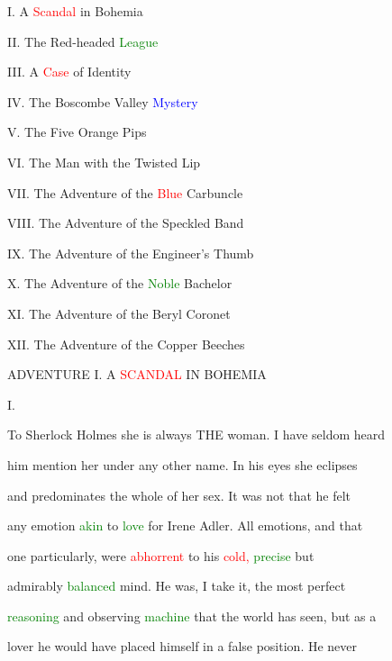  I. A \textcolor{red}{Scandal} in Bohemia

 II. The Red-headed \textcolor{green}{League}

 III. A \textcolor{red}{Case} of Identity

 IV. The Boscombe Valley \textcolor{blue}{Mystery}

 V. The Five Orange Pips

 VI. The Man with the Twisted Lip

 VII. The \textcolor{BurntOrange}{Adventure} of the \textcolor{red}{Blue} Carbuncle

 VIII. The \textcolor{BurntOrange}{Adventure} of the Speckled Band

 IX. The \textcolor{BurntOrange}{Adventure} of the Engineer's Thumb

 X. The \textcolor{BurntOrange}{Adventure} of the \textcolor{green}{Noble} Bachelor

 XI. The \textcolor{BurntOrange}{Adventure} of the Beryl Coronet

 XII. The \textcolor{BurntOrange}{Adventure} of the Copper Beeches









 \textcolor{BurntOrange}{ADVENTURE} I. A \textcolor{red}{SCANDAL} IN BOHEMIA



 I.



 To Sherlock Holmes she is always THE woman. I have seldom heard

 him mention her under any other name. In his eyes she eclipses

 and predominates the whole of her \textcolor{BurntOrange}{sex.} It was not that he felt

 any emotion \textcolor{green}{akin} to \textcolor{green}{love} for Irene Adler. All emotions, and that

 one particularly, were \textcolor{red}{abhorrent} to his \textcolor{red}{cold,} \textcolor{green}{precise} but

 admirably \textcolor{green}{balanced} mind. He was, I take it, the most \textcolor{BurntOrange}{perfect}

 \textcolor{green}{reasoning} and observing \textcolor{green}{machine} that the world has seen, but as a

 \textcolor{BurntOrange}{lover} he would have placed himself in a false position. He never


